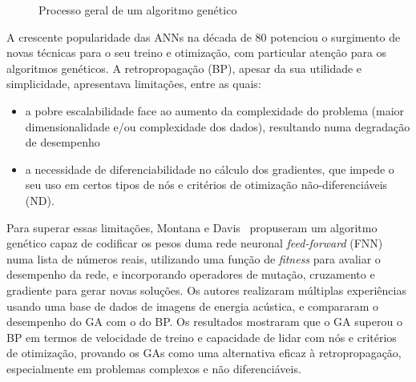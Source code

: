 \documentclass[conference]{IEEEtran}
\begin{document}
\begin{figure}[htbp]
\centering
{}
\caption{Processo geral de um algoritmo genético}
\label{fig:ea_flowchart}
\end{figure}

A crescente popularidade das ANNs na década de 80 potenciou o surgimento de novas técnicas para o seu treino e otimização, com particular atenção para os algoritmos genéticos. A retropropagação (BP), apesar da sua utilidade e simplicidade, apresentava limitações, entre as quais:
\begin{itemize}
    \item a pobre escalabilidade face ao aumento da complexidade do problema (maior dimensionalidade e/ou complexidade dos dados), resultando numa degradação de desempenho
    \item a necessidade de diferenciabilidade no cálculo dos gradientes, que impede o seu uso em certos tipos de nós e critérios de otimização não-diferenciáveis (ND).
\end{itemize}

Para superar essas limitações, Montana e Davis~\cite{Montana1989} propuseram um algoritmo genético capaz de codificar os pesos duma rede neuronal \textit{feed-forward} (FNN) numa lista de números reais, utilizando uma função de \textit{fitness} para avaliar o desempenho da rede, e incorporando operadores de mutação, cruzamento e gradiente para gerar novas soluções. Os autores realizaram múltiplas experiências usando uma base de dados de imagens de energia acústica, e compararam o desempenho do GA com o do BP. Os resultados mostraram que o GA superou o BP em termos de velocidade de treino e capacidade de lidar com nós e critérios de otimização, provando os GAs como uma alternativa eficaz à retropropagação, especialmente em problemas complexos e não diferenciáveis.
\end{document}
